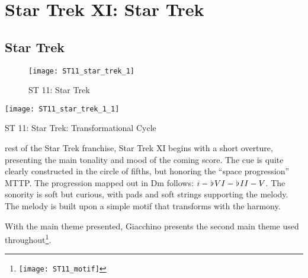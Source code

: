 
\chapter{Star Trek XI: Star Trek}\label{ch:st 11}

\section{Star Trek}

\begin{figure}[h!]
\center
\texttt{[image: ST11\_star\_trek\_1]}
	\caption{ST 11: Star Trek}
	\label{ST11_star_trek_1}
\end{figure}

\begin{marginfigure}
\texttt{[image: ST11\_star\_trek\_1\_1]}
	\caption{ST 11: Star Trek: Transformational Cycle}
	\label{ST11_star_trek_1_1}
\end{marginfigure}

\noindent{} rest of the Star Trek franchise, Star Trek XI begins with a short overture, presenting the main tonality and mood of the coming score. The cue is quite clearly constructed in the circle of fifths, but honoring the ``space progression'' \ac{MTTP}. The progression mapped out in Dm follows: \(i-\hspace*{0.18ex}\flat\hspace*{0.18ex}{VI}-\hspace*{0.18ex}\flat\hspace*{0.18ex}{II}-V\). The sonority is soft but curious, with pads and soft strings supporting the melody. The melody is built upon a simple motif that transforms with the harmony.

With the main theme presented, Giacchino presents the second main theme used throughout\footnote{\texttt{[image: ST11\_motif]}}. 
\clearpage


